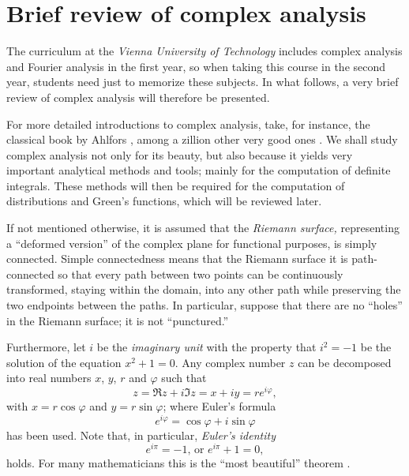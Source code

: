 \chapter{Brief review of complex analysis}
\label{2011-m-ch-ca}

The curriculum at the {\it Vienna University of Technology} includes complex analysis and Fourier analysis
in the first year, so when taking this course in the second year, students need just to memorize these subjects.
In what follows, a very brief review of complex analysis will therefore be presented.

For more detailed introductions to complex analysis,
take, for instance, the classical book by Ahlfors \cite{ahlfors:1966:ca}, among a zillion other very good ones \cite{jaenich-ft,salamon-ft}.
We shall study complex analysis not only for its beauty, but also because it yields
very important analytical methods and tools; mainly for the computation of definite integrals.
These methods will then be required for the computation of distributions and Green's functions, which will be reviewed later.

If not mentioned otherwise, it is assumed that the
{\em Riemann surface,}
representing a ``deformed version'' of the complex plane for functional purposes,
is simply connected.
Simple connectedness means that the Riemann surface
it is path-connected so that every path between two points can be continuously transformed, staying within the domain,
into any other path while preserving the two endpoints between the paths.
In particular, suppose that
there are no ``holes'' in the Riemann surface; it is not ``punctured.''

Furthermore, let $i$ be the
{\em imaginary unit}
 with the property that
 $i^2=-1$ be the solution of the equation $x^2+1=0$.
Any complex number $z$ can be decomposed into real numbers $x$, $y$, $r$ and $\varphi$ such that
\begin{equation}
z = \Re z + i \Im  z  =x +iy  =r e^{i\varphi},
\end{equation}
with $x = r\cos \varphi$
and $y = r\sin \varphi$; where {Euler's formula}
\begin{equation}
e^{i\varphi} = \cos \varphi +i \sin \varphi
\end{equation}
has been used. Note that, in particular, {\em Euler's identity}  
\begin{equation}
e^{i\pi}=-1 \textrm{, or } e^{i\pi}+1=0,
\end{equation}  holds.
For many mathematicians this is the ``most beautiful'' theorem \cite{springerlink:10.1007/BF03023741,springerlink:10.1007/BF03023741}.

